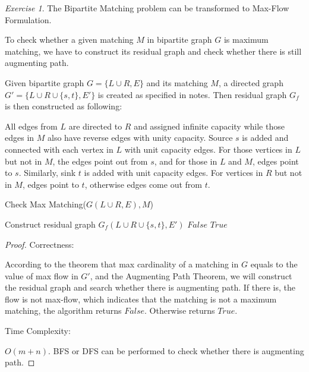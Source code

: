 \documentclass[a4paper,10pt,twoside]{article}
\theoremstyle{plain}
\theoremstyle{definition}
\theoremstyle{remark}
\newtheorem{exercise}{Exercise}
\begin{document}
\begin{exercise}
The Bipartite Matching problem can be transformed to Max-Flow Formulation.

To check whether a given matching $M$ in bipartite graph $G$ is maximum matching, we have to construct its residual graph and check whether there is still augmenting path.

Given bipartite graph $G = \{L\cup R, E\}$ and its matching $M$, a directed graph $G' = \{L\cup R \cup\{s, t\}, E'\}$ is created as specified in notes. Then residual graph $G_f$ is then constructed as following:

All edges from $L$ are directed to $R$ and assigned infinite capacity while those edges in $M$ also have reverse edges with unity capacity. Source $s$ is added and connected with each vertex in $L$ with unit capacity edges. For those vertices in $L$ but not in $M$, the edges point out from $s$, and for those in $L$ and $M$, edges point to $s$. Similarly, sink $t$ is added with unit capacity edges. For vertices in $R$ but not in $M$, edges point to $t$, otherwise edges come out from $t$.

\begin{algorithm}[h]
	\caption{Check Max Matching($G(L\cup R, E), M$)}
	Construct residual graph $G_f(L\cup R \cup\{s, t\}, E')$\;
		{\Return $False$}
	\Else
		{\Return $True$}

\end{algorithm}

\begin{proof}
Correctness:

According to the theorem that max cardinality of a matching in $G$ equals to the value of max flow in $G'$, and the Augmenting Path Theorem, we will construct the residual graph and search whether there is augmenting path. If there is, the flow is not max-flow, which indicates that the matching is not a maximum matching, the algorithm returns $False$. Otherwise returns $True$.

Time Complexity:

$O(m+n)$.
BFS or DFS can be performed to check whether there is augmenting path.
\end{proof}

\end{exercise}
\end{document}
